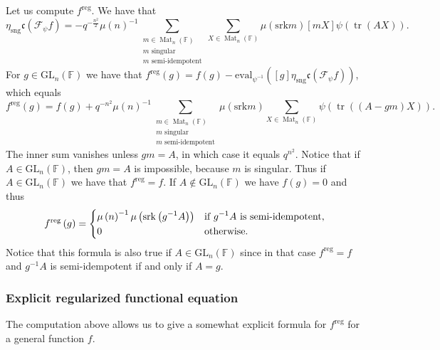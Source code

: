 \documentclass[12pt, reqno]{amsart}
\theoremstyle{definition}
\newcommand{\fieldCharacter}{\psi}
\newcommand{\trace}{\operatorname{tr}}
\newcommand{\GL}{\mathrm{GL}}
\newcommand{\finiteField}{\mathbb{F}}
\newcommand{\squareMatrix}{\operatorname{Mat}}
\newcommand{\fourierTransform}[1]{\mathcal{F}_{#1}}
\newcommand{\srank}{\mathrm{srk}}
\newcommand{\evaluation}{\mathrm{eval}}
\newcommand{\regular}{\mathrm{reg}}
\newcommand{\singular}{\mathrm{sng}}
\newcommand{\algebraIsomorphism}{\mathfrak{c}}
\begin{document}
Let us compute $f^{\regular}$. We have that
\begin{displaymath}
\eta_{\singular} \algebraIsomorphism\left(\fourierTransform{\fieldCharacter} f\right) = -q^{-\frac{n^2}{2}} \mu\left(n\right)^{-1} \sum_{\substack{m \in \squareMatrix_n\left(\finiteField\right) \\
		m \text{ singular}\\
		m \text{ semi-idempotent}}} \sum_{X \in \squareMatrix_n\left(\finiteField\right)} \mu\left(\srank m\right) \left[m X\right] \fieldCharacter\left(\trace\left(A X\right)\right).
		\end{displaymath}
For $g \in \GL_n\left(\finiteField\right)$ we have that $f^{\regular}\left(g\right) = f\left(g\right) - \evaluation_{\fieldCharacter^{-1}}\left(\left[g\right] \eta_{\singular} \algebraIsomorphism\left(\fourierTransform{\fieldCharacter} f\right)\right)$,
which equals
\begin{displaymath}
f^{\regular}\left(g\right) = f\left(g\right) + q^{-n^2} \mu\left(n\right)^{-1} \sum_{\substack{m \in \squareMatrix_n\left(\finiteField\right) \\
		m \text{ singular}\\
		m \text{ semi-idempotent}}} \mu\left(\srank m\right) \sum_{X \in \squareMatrix_n\left(\finiteField\right)} \fieldCharacter\left(\trace\left(\left(A - g m\right)X\right)\right).
		\end{displaymath}
	The inner sum vanishes unless $gm = A$, in which case it equals $q^{n^2}$. Notice that if $A \in \GL_n\left(\finiteField\right)$, then $gm = A$ is impossible, because $m$ is singular. Thus if $A \in \GL_n\left(\finiteField\right)$ we have that $f^{\regular} = f$. If $A \notin \GL_n\left(\finiteField\right)$ we have $f\left(g\right) = 0$ and thus
	\begin{displaymath}
	f^{\regular}\left(g\right) = \begin{dcases}
	\mu\left(n\right)^{-1} \mu\left( \srank \left(g^{-1} A\right) \right) & \text{if } g^{-1}A \text{ is semi-idempotent,}\\
	0 & \text{otherwise.}
	\end{dcases}
	\end{displaymath}
	Notice that this formula is also true if $A \in \GL_n\left(\finiteField\right)$ since in that case $f^{\regular} = f$ and $g^{-1} A$ is semi-idempotent if and only if $A = g$.
	
	\subsubsection{Explicit regularized functional equation}\label{subsec:regularized-godement-jacquet-functional-equation}
	The computation above allows us to give a somewhat explicit formula for $f^{\regular}$ for a general function $f$.
	
\end{document}
